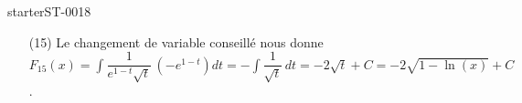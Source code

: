 \begin{corrige}{starterST-0018}
\begin{enumerate}
  \item[(15)] Le changement de variable conseillé nous donne $F_{15}(x)=\displaystyle\int \dfrac{1}{e^{1-t}\sqrt{t}}\,(-e^{1-t}) dt = -\int \dfrac{1}{\sqrt{t}}\, dt = -2\sqrt{t} + C = -2\sqrt{1-\ln(x)} + C$.
  

  \end{enumerate}
\end{corrige}
